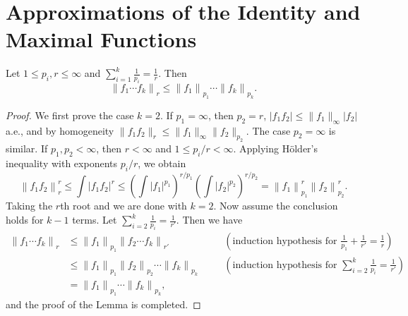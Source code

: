 \section{Approximations of the Identity and Maximal Functions}
\begin{lemma}
  Let $1 \le p_i, r \le \infty$ and
  $\sum_{i=1}^k \frac{1}{p_i} = \frac{1}{r}$.
  Then
  \[
    \left\| f_1 \cdots f_k \right\|_r \le
    \left\| f_1 \right\|_{p_1} \cdots \left\| f_k \right\|_{p_k}.
  \]
\end{lemma}
\begin{proof}
  We first prove the case $k=2$.
  If $p_1 = \infty$, then $p_2 = r$,
  $|f_1 f_2| \le \|f_1\|_{\infty} |f_2|$ a.e.,
  and by homogeneity $\|f_1 f_2\|_r \le \|f_1\|_{\infty} \|f_2\|_{p_2}$.
  The case $p_2 = \infty$ is similar.
  If $p_1, p_2 < \infty$, then $r < \infty$ and $1 \le p_i/r < \infty$.
  Applying H\"{o}lder's inequality with exponents $p_i/r$,
  we obtain
  \[
    \left\| f_1 f_2 \right\|_r^r
    \le \int \left| f_1 f_2 \right|^r
    \le \left( \int \left| f_1 \right|^{p_1} \right)^{r/p_1}
    \left( \int \left| f_2 \right|^{p_2} \right)^{r/p_2}
    = \left\| f_1 \right\|_{p_1}^r \left\| f_2 \right\|_{p_2}^r.
  \]
  Taking the $r$th root and we are done with $k=2$.
  Now assume the conclusion holds for $k-1$ terms.
  Let $\sum_{i=2}^{k} \frac{1}{p_i} = \frac{1}{r'}$.
  Then we have
  \[
    \begin{aligned}
      \left\| f_1 \cdots f_k \right\|_r
      &\le \left\| f_1 \right\|_{p_1} \left\| f_2 \cdots f_k \right\|_{r'}
      \quad &&(\text{induction hypothesis for }
      \frac{1}{p_1} + \frac{1}{r'} = \frac{1}{r}) \\
      &\le \left\| f_1 \right\|_{p_1}
      \left\| f_2 \right\|_{p_2} \cdots \left\| f_k \right\|_{p_k}
      \quad &&(\text{induction hypothesis for }
      \sum_{i=2}^{k} \frac{1}{p_i} = \frac{1}{r'}) \\
      &= \left\| f_1 \right\|_{p_1} \cdots \left\| f_k \right\|_{p_k},
    \end{aligned}
  \]
  and the proof of the Lemma is completed.
\end{proof}


